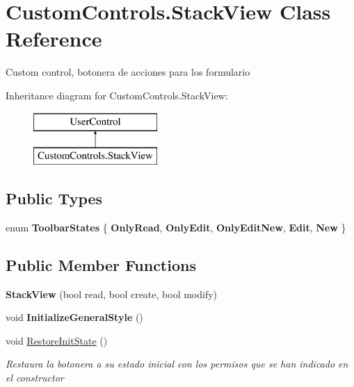\hypertarget{class_custom_controls_1_1_stack_view}{}\section{Custom\+Controls.\+Stack\+View Class Reference}
\label{class_custom_controls_1_1_stack_view}


Custom control, botonera de acciones para los formulario  


Inheritance diagram for Custom\+Controls.\+Stack\+View\+:\begin{figure}[H]
\begin{center}
\leavevmode
\includegraphics[height=2.000000cm]{class_custom_controls_1_1_stack_view}
\end{center}
\end{figure}
\subsection*{Public Types}
\begin{DoxyCompactItemize}
\item 
\mbox{\label{class_custom_controls_1_1_stack_view_ad33a71dff7cc2c25851d7cd5d75fb3c8}} 
enum {\bfseries Toolbar\+States} \{ \newline
{\bfseries Only\+Read}, 
{\bfseries Only\+Edit}, 
{\bfseries Only\+Edit\+New}, 
{\bfseries Edit}, 
\newline
{\bfseries New}
 \}
\end{DoxyCompactItemize}
\subsection*{Public Member Functions}
\begin{DoxyCompactItemize}
\item 
\mbox{\label{class_custom_controls_1_1_stack_view_af1226e4d40a4f58799de5b48de95c275}} 
{\bfseries Stack\+View} (bool read, bool create, bool modify)
\item 
\mbox{\label{class_custom_controls_1_1_stack_view_a40e9b83536de3aa4a3fd7e40bfce0246}} 
void {\bfseries Initialize\+General\+Style} ()
\item 
void \hyperlink{class_custom_controls_1_1_stack_view_aa6ee6db47352fbb47bc1292ea7f58611}{Restore\+Init\+State} ()
\begin{DoxyCompactList}\small\item\em Restaura la botonera a su estado inicial con los permisos que se han indicado en el constructor \end{DoxyCompactList}\end{DoxyCompactItemize}
